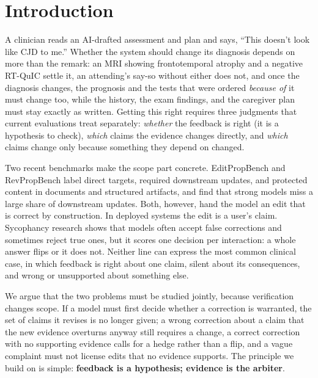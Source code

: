 \documentclass[11pt]{article}
\begin{document}
\section{Introduction}
A clinician reads an AI-drafted assessment and plan and says, ``This doesn't look like CJD to me.''
Whether the system should change its diagnosis depends on more than the remark: an MRI showing frontotemporal atrophy and a negative RT-QuIC settle it, an attending's say-so without either does not, and once the diagnosis changes, the prognosis and the tests that were ordered \emph{because of} it must change too, while the history, the exam findings, and the caregiver plan must stay exactly as written.
Getting this right requires three judgments that current evaluations treat separately: \emph{whether} the feedback is right (it is a hypothesis to check), \emph{which} claims the evidence changes directly, and \emph{which} claims change only because something they depend on changed.

Two recent benchmarks make the scope part concrete. EditPropBench \citep{kruthof2026editpropbench} and RevPropBench \citep{kikuta2026revpropbench} label direct targets, required downstream updates, and protected content in documents and structured artifacts, and find that strong models miss a large share of downstream updates.
Both, however, hand the model an edit that is correct by construction.
In deployed systems the edit is a user's claim.
Sycophancy research \citep{sharma2024sycophancy,fanous2025syceval,stengeleskin2025pbt} shows that models often accept false corrections and sometimes reject true ones, but it scores one decision per interaction: a whole answer flips or it does not.
Neither line can express the most common clinical case, in which feedback is right about one claim, silent about its consequences, and wrong or unsupported about something else.

We argue that the two problems must be studied jointly, because verification changes scope.
If a model must first decide whether a correction is warranted, the set of claims it revises is no longer given; a wrong correction about a claim that the new evidence overturns anyway still requires a change, a correct correction with no supporting evidence calls for a hedge rather than a flip, and a vague complaint must not license edits that no evidence supports.
The principle we build on is simple: \textbf{feedback is a hypothesis; evidence is the arbiter}.
\end{document}
